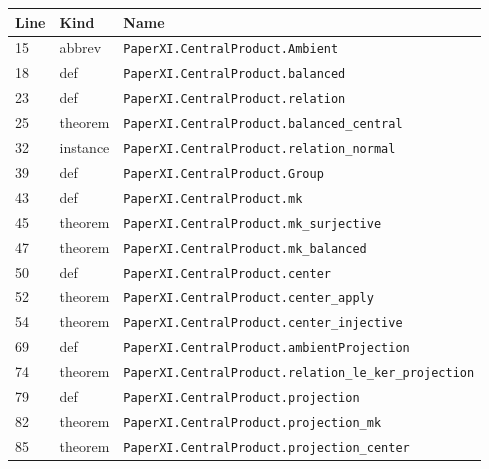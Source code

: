 \documentclass[10pt,oneside]{book}
\begin{document}
\begin{longtable}{@{}p{}p{}p{}@{}}\toprule Line&Kind&Name\\\midrule\endhead

15&abbrev&\nolinkurl{PaperXI.CentralProduct.Ambient}\\

18&def&\nolinkurl{PaperXI.CentralProduct.balanced}\\

23&def&\nolinkurl{PaperXI.CentralProduct.relation}\\

25&theorem&\nolinkurl{PaperXI.CentralProduct.balanced_central}\\

32&instance&\nolinkurl{PaperXI.CentralProduct.relation_normal}\\

39&def&\nolinkurl{PaperXI.CentralProduct.Group}\\

43&def&\nolinkurl{PaperXI.CentralProduct.mk}\\

45&theorem&\nolinkurl{PaperXI.CentralProduct.mk_surjective}\\

47&theorem&\nolinkurl{PaperXI.CentralProduct.mk_balanced}\\

50&def&\nolinkurl{PaperXI.CentralProduct.center}\\

52&theorem&\nolinkurl{PaperXI.CentralProduct.center_apply}\\

54&theorem&\nolinkurl{PaperXI.CentralProduct.center_injective}\\

69&def&\nolinkurl{PaperXI.CentralProduct.ambientProjection}\\

74&theorem&\nolinkurl{PaperXI.CentralProduct.relation_le_ker_projection}\\

79&def&\nolinkurl{PaperXI.CentralProduct.projection}\\

82&theorem&\nolinkurl{PaperXI.CentralProduct.projection_mk}\\

85&theorem&\nolinkurl{PaperXI.CentralProduct.projection_center}\\


\end{longtable}
\end{document}
